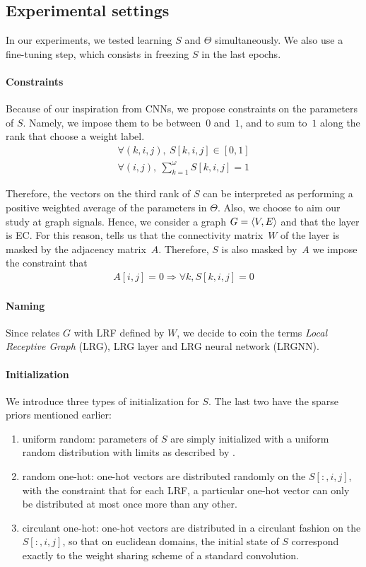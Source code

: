 \subsection{Experimental settings}
In our experiments, we tested learning $S$ and $\Theta$ simultaneously. We also use a fine-tuning step, which consists in freezing $S$ in the last epochs.

\paragraph{Constraints}
Because of our inspiration from CNNs, we propose constraints on the parameters of $S$. Namely, we impose them to be between~$0$ and~$1$, and to sum to~$1$ along the rank that choose a weight label.
\begin{gather}
\forall (k,i,j),~S[k,i,j] \in [0,1]\\
\forall (i,j),~\displaystyle \sum_{k=1}^\omega S[k,i,j] = 1
\end{gather}

Therefore, the vectors on the third rank of $S$ can be interpreted as performing a positive weighted average of the parameters in $\Theta$.
Also, we choose to aim our study at graph signals. Hence, we consider a graph $G = \langle V, E \rangle$ and that the layer is EC. For this reason,  tells us that the connectivity matrix~$W$ of the layer is masked by the adjacency matrix~$A$. Therefore, $S$ is also masked by~$A$ \ie we impose the constraint that
\begin{gather}
A[i,j] = 0 \Rightarrow \forall k, S[k,i,j] = 0
\end{gather}

\paragraph{Naming}
Since  relates $G$ with LRF defined by $W$, we decide to coin the terms \emph{Local Receptive Graph} (LRG), LRG layer and LRG neural network (LRGNN).

\paragraph{Initialization}
We introduce three types of initialization for $S$. The last two have the sparse priors mentioned earlier:
\begin{enumerate}
  \item uniform random: parameters of $S$ are simply initialized with a uniform random distribution with limits as described by \cite{glorot2010understanding}.
  \item random one-hot: one-hot vectors are distributed randomly on the $S[:,i,j]$, with the constraint that for each LRF, a particular one-hot vector can only be distributed at most once more than any other.
  \item circulant one-hot: one-hot vectors are distributed in a circulant fashion on the $S[:,i,j]$, so that on euclidean domains, the initial state of $S$ correspond exactly to the weight sharing scheme of a standard convolution.
\end{enumerate}

